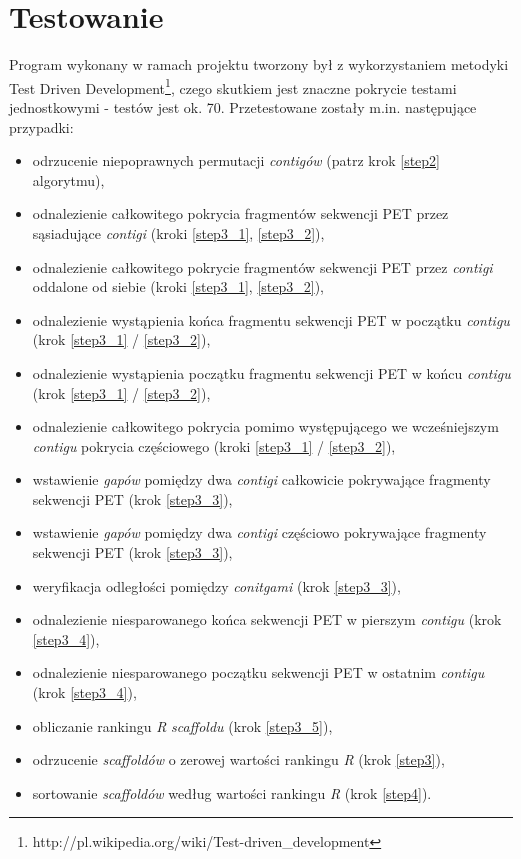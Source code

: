 \documentclass[a4paper,10pt]{article}
\begin{document}
\section*{Testowanie}
Program wykonany w ramach projektu tworzony był z wykorzystaniem metodyki Test Driven Development\footnote{http://pl.wikipedia.org/wiki/Test-driven\_development}, czego skutkiem jest znaczne pokrycie testami jednostkowymi - testów jest ok. 70. Przetestowane zostały m.in. następujące przypadki:
\begin{itemize}
 \item odrzucenie niepoprawnych permutacji \emph{contigów} (patrz krok \ref{step2} algorytmu),
 \item odnalezienie całkowitego pokrycia fragmentów sekwencji PET przez sąsiadujące \emph{contigi} (kroki \ref{step3_1}, \ref{step3_2}),
 \item odnalezienie całkowitego pokrycie fragmentów sekwencji PET przez \emph{contigi} oddalone od siebie (kroki \ref{step3_1}, \ref{step3_2}),
 \item odnalezienie wystąpienia końca fragmentu sekwencji PET w początku \emph{contigu} (krok \ref{step3_1} / \ref{step3_2}),
 \item odnalezienie wystąpienia początku fragmentu sekwencji PET w końcu \emph{contigu} (krok \ref{step3_1} / \ref{step3_2}),
 \item odnalezienie całkowitego pokrycia pomimo występującego we wcześniejszym \emph{contigu} pokrycia częściowego (kroki \ref{step3_1} / \ref{step3_2}),
 \item wstawienie \emph{gapów} pomiędzy dwa \emph{contigi} całkowicie pokrywające fragmenty sekwencji PET (krok \ref{step3_3}),
 \item wstawienie \emph{gapów} pomiędzy dwa \emph{contigi} częściowo pokrywające fragmenty sekwencji PET (krok \ref{step3_3}),
 \item weryfikacja odległości pomiędzy \emph{conitgami} (krok \ref{step3_3}),
 \item odnalezienie niesparowanego końca sekwencji PET w pierszym \emph{contigu} (krok \ref{step3_4}),
 \item odnalezienie niesparowanego początku sekwencji PET w ostatnim \emph{contigu} (krok \ref{step3_4}),
 \item obliczanie rankingu \emph{R} \emph{scaffoldu} (krok \ref{step3_5}),
 \item odrzucenie \emph{scaffoldów} o zerowej wartości rankingu \emph{R} (krok \ref{step3}),
 \item sortowanie \emph{scaffoldów} według wartości rankingu \emph{R} (krok \ref{step4}).
\end{itemize}
\end{document}
